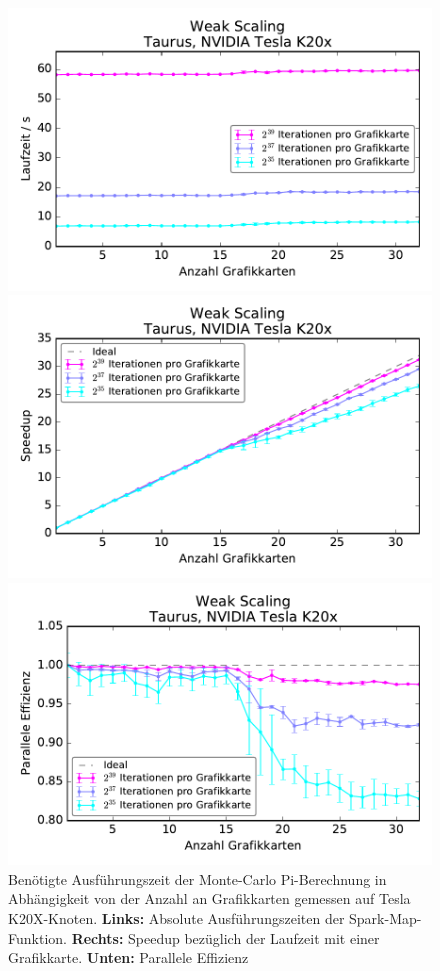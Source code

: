 \begin{figure}[H]
	\centering
	\begin{minipage}{0.5\linewidth}
		\includegraphics[width=\linewidth]{../MontePi/benchmark/weak-scaling-time-gpu.pdf}
	\end{minipage}\begin{minipage}{0.5\linewidth}
		\includegraphics[width=\linewidth]{../MontePi/benchmark/weak-scaling-speedup-gpu.pdf}
	\end{minipage}
    \centerline{\includegraphics[width=0.5\linewidth]{../MontePi/benchmark/weak-scaling-efficiency-gpu.pdf}}
	\caption{Benötigte Ausführungszeit der Monte-Carlo Pi-Berechnung in Abhängigkeit von der Anzahl an Grafikkarten gemessen auf Tesla K20X-Knoten. \textbf{Links:} Absolute Ausführungszeiten der Spark-Map-Funktion. \textbf{Rechts:} Speedup bezüglich der Laufzeit mit einer Grafikkarte. \textbf{Unten:} Parallele Effizienz}
	\label{fig:montepiweakscaling}
\end{figure}

